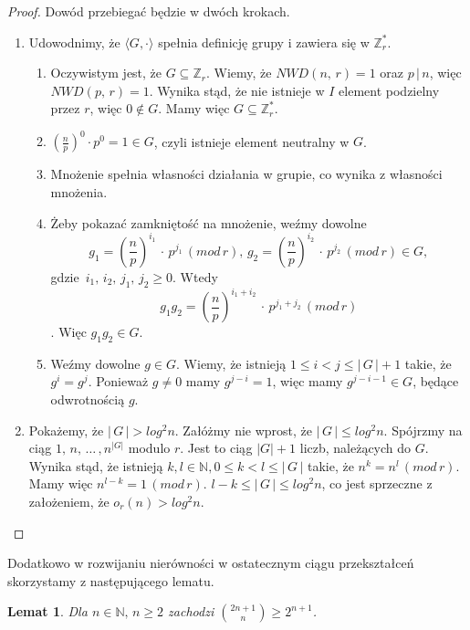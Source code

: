 \documentclass[polish,declaration,shortabstract]{iithesis}
\theoremstyle{definition}
\theoremstyle{remark} \newtheorem{observation}{Obserwacja}
\theoremstyle{plain} \newtheorem{theorem}{Twierdzenie}
\theoremstyle{plain} \newtheorem{lemma}{Lemat}
\theoremstyle{remark} \newtheorem*{remark*}{Uwaga}
\theoremstyle{reminder} \newtheorem*{reminder*}{Przypomnienie}
\begin{document}
\begin{proof}
	Dowód przebiegać będzie w dwóch krokach.
	\begin{enumerate}[label=(\arabic*),leftmargin=.4in]
		\item Udowodnimy, że $\langle G, \cdot \rangle$ spełnia definicję grupy i zawiera się w $\mathbb{Z}_r^*$.
		      \begin{enumerate}[label=(1.\arabic*)]
		      	\item Oczywistym jest, że $G \subseteq \mathbb{Z}_r$. Wiemy, że $NWD(n, \, r) = 1$ oraz $p \, | \, n$, więc $NWD(p, \, r) = 1$. Wynika stąd, że nie istnieje w $I$ element podzielny przez $r$, więc $0 \notin G$. Mamy więc $G \subseteq \mathbb{Z}_r^*$. 
		      	\item $(\frac{n}{p})^0\cdot p^0 = 1 \in G$, czyli istnieje element neutralny w $G$. 
		      	\item Mnożenie spełnia własności działania w grupie, co wynika z własności mnożenia.
		      	\item Żeby pokazać zamkniętość na mnożenie, weźmy dowolne \[g_1 = (\frac{n}{p})^{i_1} \, \cdot \, p^{j_1} \, (mod\,r), \, g_2 = (\frac{n}{p})^{i_2} \, \cdot \, p^{j_2}  \, (mod\,r) \in G,\] gdzie $\, i_1, \,i_2, \,j_1, \, j_2 \geq 0$. Wtedy \[g_1g_2 = (\frac{n}{p})^{i_1 + i_2} \, \cdot \, p^{j_1 + j_2} \, (mod\,r)\]. Więc $g_1g_2\in G$.
		      	\item Weźmy dowolne $g \in G$. Wiemy, że istnieją $1 \leq i < j \leq | \, G \, | + 1$ takie, że $g^i = g^j$. Ponieważ $g \neq 0$ mamy $g^{j - i} = 1$, więc mamy $g^{j - i - 1} \in G$, będące odwrotnością $g$.
		      \end{enumerate}
		\item Pokażemy, że $|\,G\,| > log^2n$. Załóżmy nie wprost, że $|\,G\,| \leq log^2n$. Spójrzmy na ciąg $1,\, n, \, \dots\,, n^{|G|}$ modulo $r$. Jest to ciąg $|G| + 1$ liczb, należących do $G$. Wynika stąd, że istnieją $k, l \in \mathbb{N}, 0 \leq k < l \leq |\,G\,|$ takie, że $n^k = n^l \, (mod\,r)$. Mamy więc $n^{l-k} = 1 \, (mod\,r)$. $l - k \leq |\,G\,| \leq log^2n$, co jest sprzeczne z założeniem, że $o_r(n) > log^2n$. 
	\end{enumerate}
\end{proof}

Dodatkowo w rozwijaniu nierówności w ostatecznym ciągu przekształceń skorzystamy z następującego lematu.

\begin{lemma}\label{newton1}
	Dla $n \in \mathbb{N}, \, n \geq 2$ zachodzi ${2n + 1 \choose n} \geq 2^{n+1}$.
\end{lemma}
	
\end{document}
